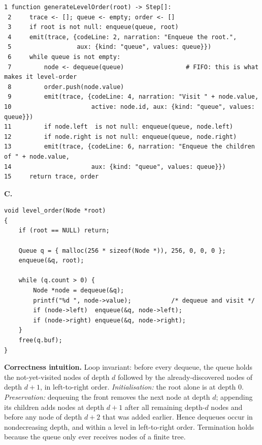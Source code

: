 \documentclass[11pt,a4paper]{article}
\newcommand{\ct}[1]{\texttt{#1}}
\begin{document}
\begin{lstlisting}[style=pseudo,caption={Instrumented level-order traversal. The queue is the
algorithm's frontier, and the \ct{aux} payload is that queue itself.},label={lst:levelorder}]
 1 function generateLevelOrder(root) -> Step[]:
 2     trace <- []; queue <- empty; order <- []
 3     if root is not null: enqueue(queue, root)
 4     emit(trace, {codeLine: 2, narration: "Enqueue the root.",
 5                  aux: {kind: "queue", values: queue}})
 6     while queue is not empty:
 7         node <- dequeue(queue)                 # FIFO: this is what makes it level-order
 8         order.push(node.value)
 9         emit(trace, {codeLine: 4, narration: "Visit " + node.value,
10                      active: node.id, aux: {kind: "queue", values: queue}})
11         if node.left  is not null: enqueue(queue, node.left)
12         if node.right is not null: enqueue(queue, node.right)
13         emit(trace, {codeLine: 6, narration: "Enqueue the children of " + node.value,
14                      aux: {kind: "queue", values: queue}})
15     return trace, order
\end{lstlisting}

\smallskip
\noindent\textbf{C.}
\begin{lstlisting}[style=c,caption={Level-order traversal in C. The \ct{Queue} of Listing~\ref{lst:ctypes} is the FIFO frontier.},label={lst:c-levelorder}]
void level_order(Node *root)
{
    if (root == NULL) return;

    Queue q = { malloc(256 * sizeof(Node *)), 256, 0, 0, 0 };
    enqueue(&q, root);

    while (q.count > 0) {
        Node *node = dequeue(&q);
        printf("%d ", node->value);           /* dequeue and visit */
        if (node->left)  enqueue(&q, node->left);
        if (node->right) enqueue(&q, node->right);
    }
    free(q.buf);
}
\end{lstlisting}

\noindent\textbf{Correctness intuition.} Loop invariant: before every dequeue, the queue holds the
not-yet-visited nodes of depth $d$ followed by the already-discovered nodes of depth $d+1$, in
left-to-right order. \emph{Initialisation:} the root alone is at depth $0$. \emph{Preservation:}
dequeuing the front removes the next node at depth $d$; appending its children adds nodes at
depth $d+1$ after all remaining depth-$d$ nodes and before any node of depth $d+2$ that was
added earlier. Hence dequeues occur in nondecreasing depth, and within a level in left-to-right
order. Termination holds because the queue only ever receives nodes of a finite tree.
\end{document}
